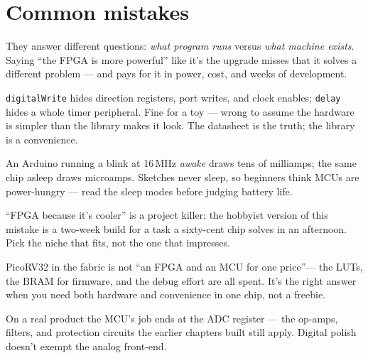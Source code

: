 \section{Common mistakes}\label{sec:cm19}

\begin{tripwire}
They answer different questions: \emph{what program runs} versus
\emph{what machine exists}. Saying ``the FPGA is more powerful''
like it's the upgrade misses that it solves a different problem
--- and pays for it in power, cost, and weeks of development.
\end{tripwire}
\begin{tripwire}
\texttt{digitalWrite} hides direction registers, port writes, and
clock enables; \texttt{delay} hides a whole timer peripheral. Fine
for a toy --- wrong to assume the hardware is simpler than the
library makes it look. The datasheet is the truth; the library is
a convenience.
\end{tripwire}
\begin{tripwire}
An Arduino running a blink at 16\,MHz \emph{awake} draws tens of
milliamps; the same chip asleep draws microamps. Sketches never
sleep, so beginners think MCUs are power-hungry --- read the sleep
modes before judging battery life.
\end{tripwire}
\begin{tripwire}
``FPGA because it's cooler'' is a project killer: the hobbyist
version of this mistake is a two-week build for a task a
sixty-cent chip solves in an afternoon. Pick the niche that fits,
not the one that impresses.
\end{tripwire}
\begin{tripwire}
PicoRV32 in the fabric is not ``an FPGA and an MCU for one
price''--- the LUTs, the BRAM for firmware, and the debug effort
are all spent. It's the right answer when you need both hardware
and convenience in one chip, not a freebie.
\end{tripwire}
\begin{tripwire}
On a real product the MCU's job ends at the ADC register --- the
op-amps, filters, and protection circuits the earlier chapters
built still apply. Digital polish doesn't exempt the analog
front-end.
\end{tripwire}

